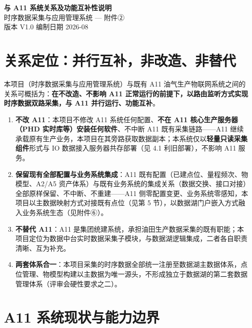 \documentclass[11pt,a4paper]{ctexart}
\begin{document}
\begin{center}
{\Huge\bfseries 与 A11 系统关系及功能互补性说明}\\[14pt]
{\large 时序数据采集与应用管理系统 — 附件②}\\[8pt]
{\large 版本 V1.0 \quad 编制日期 2026-08}
\end{center}

\vspace{1em}
\noindent\hrulefill
\vspace{1em}

\section{关系定位：并行互补，非改造、非替代}

本项目（时序数据采集与应用管理系统）与既有 A11 油气生产物联网系统之间的关系可概括为：\textbf{在不改造、不影响 A11 正常运行的前提下，以路由监听方式实现时序数据双路采集，与 A11 并行运行、功能互补}。

\begin{enumerate}[leftmargin=*]
  \item \textbf{不改 A11}：本项目不修改 A11 系统任何配置、\textbf{不在 A11 核心生产服务器（PHD 实时库等）安装任何软件}、不中断 A11 既有采集链路——A11 继续承载原有生产业务，本项目在其旁路获取数据副本；本系统仅以\textbf{轻量只读采集组件}形式与 IO 数据接入服务器共存部署（见 4.1 利旧部署），不影响 A11 服务。
  \item \textbf{保留现有全部配置与业务系统集成}：A11 既有配置（已建点位、量程频次、物模型、A2/A5 资产体系）与既有业务系统的集成关系（数据交换、接口对接）全部原样保留、不中断、不重建——A11 侧零配置变更、业务系统零感知，本项目以主数据映射方式对接既有点位（见第 5 节），以数据湖门户嵌入方式融入业务系统生态（见附件⑥）。
  \item \textbf{不替代 A11}：A11 是集团统建系统，承担油田生产数据采集的既有职能；本项目定位为数据中台实时数据采集子模块，与数据湖逻辑集成，二者各自职责清晰、互为补充。
  \item \textbf{两套体系合一}：本项目采集的时序数据全部统一注册至数据湖主数据体系，点位管理、物模型构建以主数据为唯一源头，不形成独立于数据湖的第二套数据管理体系（评审会硬性要求之二）。
\end{enumerate}

\section{A11 系统现状与能力边界}
\end{document}
